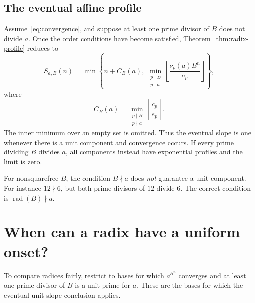 \documentclass[11pt,a4paper]{article}
\theoremstyle{definition}
\newcommand{\rad}{\operatorname{rad}}
\begin{document}
\subsection{The eventual affine profile}
Assume~\eqref{eq:convergence}, and suppose at least one prime divisor of
$B$ does not divide $a$. Once the order conditions have become satisfied,
Theorem~\ref{thm:radix-profile} reduces to
\begin{equation}\label{eq:radix-envelope}
S_{a,B}(n)=\min\left\{n+C_B(a),\ 
\min_{\substack{p\mid B\\p\mid a}}
\left\lfloor\frac{\nu_p(a)B^n}{e_p}\right\rfloor\right\},
\end{equation}
where
\[
C_B(a)=\min_{\substack{p\mid B\\p\nmid a}}
\left\lfloor\frac{c_p}{e_p}\right\rfloor.
\]
The inner minimum over an empty set is omitted. Thus the eventual slope is
one whenever there is a unit component and convergence occurs.
If every prime dividing $B$ divides $a$, all components instead have
exponential profiles and the limit is zero.

For nonsquarefree $B$, the condition $B\nmid a$ does \emph{not} guarantee
a unit component. For instance $12\nmid6$, but both prime divisors of $12$
divide $6$. The correct condition is $\rad(B)\nmid a$.

\section{When can a radix have a uniform onset?}\label{sec:uniform-radix}

To compare radices fairly, restrict to bases for which $a^{B^n}$ converges
and at least one prime divisor of $B$ is a unit prime for $a$. These are the
bases for which the eventual unit-slope conclusion applies.
\end{document}
